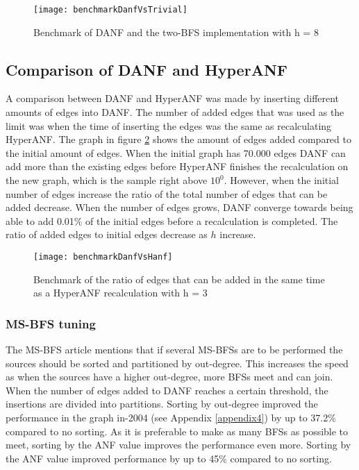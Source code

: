 \begin{figure}[h]
\centering
\texttt{[image: benchmarkDanfVsTrivial]}    
\captionsetup{justification=centering}
\caption {Benchmark of DANF and the two-BFS implementation with h = 8}
\label{fig:benchmarkDanfVsTrivial}
\end{figure}


\subsection{Comparison of DANF and HyperANF}
A comparison between DANF and HyperANF was made by inserting different amounts of edges into DANF. The number of added edges that was used as the limit was when the time of inserting the edges was the same as recalculating HyperANF. The graph in figure \ref{fig:benchmarkDanfVsHanf} shows the amount of edges added compared to the initial amount of edges. When the initial graph has 70.000 edges DANF can add more than the existing edges before HyperANF finishes the recalculation on the new graph, which is the sample right above $10^0$. However, when the initial number of edges increase the ratio of the total number of edges that can be added decrease. When the number of edges grows, DANF converge towards being able to add 0.01\% of the initial edges before a recalculation is completed. The ratio of added edges to initial edges decrease as $h$ increase.

\begin{figure}[h]
\centering
\texttt{[image: benchmarkDanfVsHanf]}    
\captionsetup{justification=centering}
\caption {Benchmark of the ratio of edges that can be added in the same time as a HyperANF recalculation with h = 3}
\label{fig:benchmarkDanfVsHanf}
\end{figure}

\subsubsection{MS-BFS tuning}
The MS-BFS article \cite{msbfs} mentions that if several MS-BFSs are to be performed the sources should be sorted and partitioned by out-degree. This increases the speed as when the sources have a higher out-degree, more BFSs meet and can join. When the number of edges added to DANF reaches a certain threshold, the insertions are divided into partitions. Sorting by out-degree improved the performance in the graph in-2004 (see Appendix \ref{appendix4}) by up to 37.2\% compared to no sorting. As it is preferable to make as many BFSs as possible to meet, sorting by the ANF value improves the performance even more. Sorting by the ANF value improved performance by up to 45\% compared to no sorting.   


